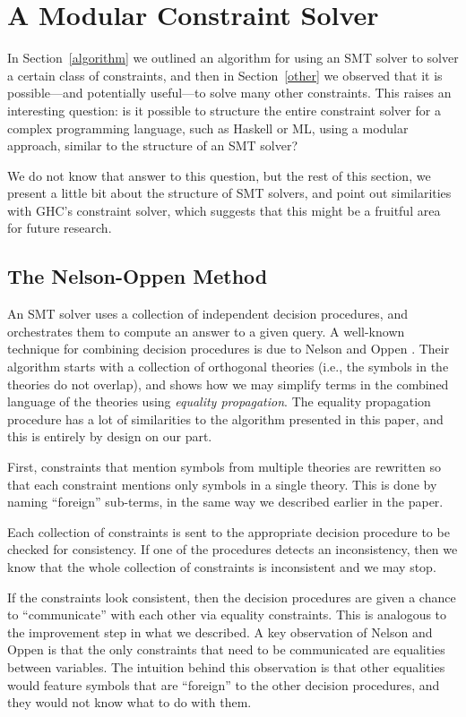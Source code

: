 \documentclass{sigplanconf}
\begin{document}
\section{A Modular Constraint Solver}
\label{modular-typechecker}

In Section~\ref{algorithm} we outlined an algorithm for using an SMT solver
to solver a certain class of constraints, and then
in Section~\ref{other} we observed that it is possible---and potentially
useful---to solve many other constraints.  This raises an interesting
question: is it possible to structure the entire constraint solver for
a complex programming language, such as Haskell or ML, using a modular
approach, similar to the structure of an SMT solver?

We do not know that answer to this question, but the rest of this section,
we present a little bit about the structure of SMT solvers, and point out
similarities with GHC's constraint solver, which suggests that this might
be a fruitful area for future research.

\subsection{The Nelson-Oppen Method}

An SMT solver uses a collection of independent decision procedures,
and orchestrates them to compute an answer to a given query.  A well-known
technique for combining decision procedures is due to Nelson and Oppen
\cite{NelsonOppen}.  Their algorithm starts with a collection of
orthogonal theories (i.e., the symbols in the theories do not overlap),
and shows how we may simplify terms in the combined language of the
theories using {\em equality propagation}.  The equality propagation procedure
has a lot of similarities to the algorithm presented in this paper,
and this is entirely by design on our part.

First, constraints that mention symbols from multiple theories are
rewritten so that each constraint mentions only symbols in a single theory.
This is done by naming ``foreign'' sub-terms, in the same way we described
earlier in the paper.

Each collection of constraints is sent to the appropriate decision
procedure to be checked for consistency.  If one of the procedures
detects an inconsistency, then we know that the whole collection of
constraints is inconsistent and we may stop.

If the constraints look consistent, then the decision procedures
are given a chance to ``communicate'' with each other via equality
constraints.  This is analogous to the improvement step in what we
described.  A key observation of Nelson and Oppen is that the only
constraints that need to be communicated are equalities between variables.
The intuition behind this observation is that other equalities would
feature symbols that are ``foreign'' to the other decision procedures,
and they would not know what to do with them.
\end{document}

